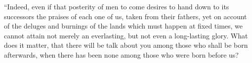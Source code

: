  ``Indeed, even if that posterity of men to come desires to hand down to its successors the praises of each one of us, taken from their fathers, yet on account of the deluges and burnings of the lands which must happen at fixed times, we cannot attain not merely an everlasting, but not even a long-lasting glory. What does it matter, that there will be talk about you among those who shall be born afterwards, when there has been none among those who were born before us?












































